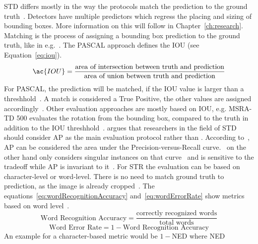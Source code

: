 \ac{STD} differs mostly in the way the protocols match the prediction to the ground
truth~\citep{long_scene_2021}.
Detectors have multiple predictors which regress the placing and sizing of bounding boxes.
More information on this will follow in Chapter~\ref{ch:research}.
Matching is the process of assigning a bounding box prediction to the ground
truth, like in e.g.~\cite{liu_ssd_2016,liao_textboxes_2018}.
The PASCAL approach defines the \ac{IOU} (see Equation~\ref{eq:iou}).
\begin{equation}\label{eq:iou}
    \ac{IOU}=
            \frac{\text{area of intersection between truth and prediction}}{\text{area of union
            between truth and prediction}}
\end{equation}
For PASCAL, the prediction will be matched, if the \ac{IOU} value is larger than a
threshhold~\citep{long_scene_2021}.
A match is considered a True Positive, the other values are assigned accordingly~\citep{sun_icdar_2019}.
Other evaluation approaches are mostly based on \ac{IOU}, e.g. MSRA-TD 500 evaluates the rotation
from the bounding box, compared to the truth in addition to the \ac{IOU}
threshhold~\citep{long_scene_2021}.
\cite{long_scene_2021} argues that researchers in the field of \ac{STD} should consider \ac{AP}
as the main evaluation protocol rather than \fone.
According to~\cite{su_relationship_2015}, \ac{AP} can be considered the area under the
Precision-versus-Recall curve.
\fone\ on the other hand only considers singular instances on that curve~\citep{long_scene_2021} and
is sensitive to the tradeoff while \ac{AP} is invariant to it~\citep{shi_icdar2017_2017}.
For \ac{STR} the evaluation can be based on character-level or word-level.
There is no need to match ground truth to prediction, as the image is already
cropped~\citep{long_scene_2021}.
The equations~\ref{eq:wordRecognitionAccuracy} and~\ref{eq:wordErrorRate} show metrics based on
word level~\citep{chen_text_2021}.
\begin{equation}\label{eq:wordRecognitionAccuracy}
\text{Word Recognition Accuracy} = \frac{\text{correctly recognized words}}{\text{total words}}
\end{equation}
\begin{equation}\label{eq:wordErrorRate}
    \text{Word Error Rate} = 1 - \text{Word Recognition Accuracy}
\end{equation}
An example for a character-based metric would be $1 - $NED where \ac{NED}

